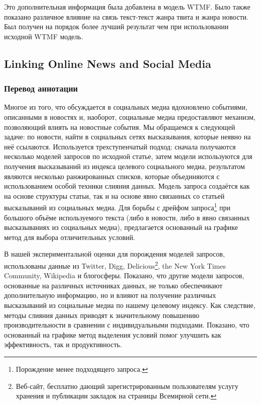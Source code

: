             Это дополнительная информация была добавлена в модель WTMF. Было также показано различное влияние на связь текст-текст жанра твита и жанра новости. Был получен на порядок более лучший результат чем при использовании исходной WTMF модель.

    \subsection{Linking Online News and Social Media}
        \subsubsection{Перевод аннотации}
            Многое из того, что обсуждается в социальных медиа вдохновлено событиями, описанными в новостях и, наоборот, социальные медиа предоставляют механизм, позволяющий влиять на новостные события.
            Мы обращаемся к следующей задаче: по новости, найти в социальных сетях высказывания, которые неявно на неё ссылаются.
            Используется трехступенчатый подход: сначала получаются несколько моделей запросов по исходной статье, затем модели используются для получения высказываний из индекса целевого социального медиа, результатом являются несколько ранжированных списков, которые объединяются с использованием особой техники слияния данных.
            Модель запроса создаётся как на основе структуры статьи, так и на основе явно связанных со статьей высказываний из социальных медиа.
            Для борьбы с дрейфом запроса\footnote{Порождение менее подходящего запроса.} при большого объёме используемого текста (либо в новости, либо в явно связанных высказываниях из социальных медиа), предлагается основанный на графике метод для выбора отличительных условий.

            В нашей экспериментальной оценки для порождения моделей запросов, использованы данные из Twitter, Digg, Delicious\footnote{Веб-сайт, бесплатно дающий зарегистрированным пользователям услугу хранения и публикации закладок на страницы Всемирной сети.}, the New York Times Community, Wikipedia и блогосферы.
            Показано, что другие модели запросов, основанные на различных источниках данных, не только обеспечивают дополнительную информацию, но и влияют на получение различных высказываний из социальные медиа по нашему целевому индексу.
            Как следствие, методы слияния данных приводят к значительному повышению производительности в сравнении с индивидуальными подходами.
            Показано, что основанный на графике метод выделения условий помог улучшить как эффективность, так и продуктивность.

